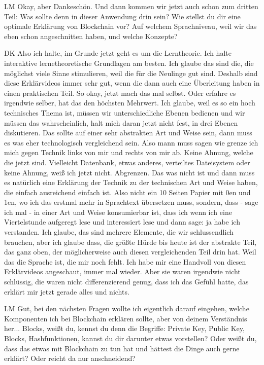 \begin{xlist}
     \item[LM] Okay, aber Dankeschön. Und dann kommen wir jetzt auch schon zum dritten Teil: Was sollte denn in dieser Anwendung drin sein? Wie stellst du dir eine optimale Erklärung von Blockchain vor? Auf welchem Sprachniveau, weil wir das eben schon angeschnitten haben, und welche Konzepte?
     \item[DK] Also ich halte, im Grunde jetzt geht es um die Lerntheorie. Ich halte interaktive lernetheoretische Grundlagen am besten. Ich glaube das sind die, die möglichst viele Sinne stimulieren, weil die für die Neulinge gut sind. Deshalb sind diese Erklärvideos immer sehr gut, wenn die dann auch eine Überleitung haben in einen praktischen Teil. So okay, jetzt mach das mal selbst. Oder erfahre es irgendwie selber, hat das den höchsten Mehrwert. Ich glaube, weil es so ein hoch technisches Thema ist, müssen wir unterschiedliche Ebenen bedienen und wir müssen das wahrscheinlich, halt mich daran jetzt nicht fest, in drei Ebenen diskutieren. Das sollte auf einer sehr abstrakten Art und Weise sein, dann muss es was eher technologisch vergleichend sein. Also mann muss sagen wie grenze ich mich gegen Technik links von mir und rechts von mir ab. Keine Ahnung, welche die jetzt sind. Vielleicht Datenbank, etwas anderes, verteiltes Dateisystem oder keine Ahnung, weiß ich jetzt nicht. Abgrenzen. Das was nicht ist und dann muss es natürlich eine Erklärung der Technik zu der technischen Art und Weise haben, die einfach ausreichend einfach ist. Also nicht ein 10 Seiten Papier mit 0en und 1en, wo ich das erstmal mehr in Sprachtext übersetzen muss, sondern, dass - sage ich mal - in einer Art und Weise konsumierbar ist, dass ich wenn ich eine Viertelstunde aufgeregt lese und interessiert lese und dann sage: ja habe ich verstanden. Ich glaube, das sind mehrere Elemente, die wir schlussendlich brauchen, aber ich glaube dass, die größte Hürde bis heute ist der abstrakte Teil, das ganz oben, der möglicherweise auch diesen vergleichenden Teil drin hat. Weil das die Sprache ist, die mir noch fehlt. Ich habe mir eine Handvoll von diesen Erklärvideos angeschaut, immer mal wieder. Aber sie waren irgendwie nicht schlüssig, die waren nicht differenzierend genug, dass ich das Gefühl hatte, das erklärt mir jetzt gerade alles und nichts. 
     \item[LM] Gut, bei den nächsten Fragen wollte ich eigentlich darauf eingehen, welche Komponenten ich bei Blockchain erklären sollte, aber von deinem Verständnis her... Blocks, weißt du, kennst du denn die Begriffe: Private Key, Public Key, Blocks, Hashfunktionen, kannst du dir darunter etwas vorstellen? Oder weißt du, dass das etwas mit Blockchain zu tun hat und hättest die Dinge auch gerne erklärt? Oder reicht da nur anschneidend?

\end{xlist}
